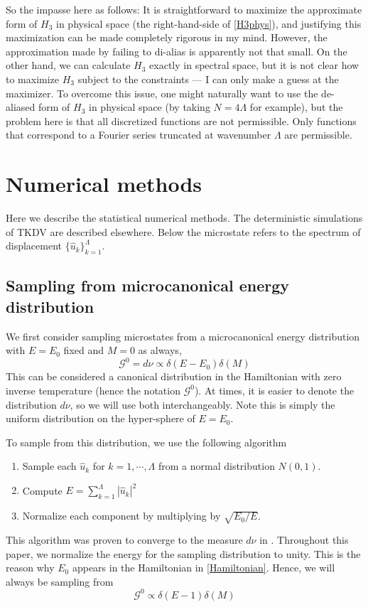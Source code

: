 \documentclass[12pt]{article}
\newcommand{\np}{\newpage \noindent}
\newcommand{\abs}[1]{\left| #1 \right|}
\newcommand{\uhat}{\hat{u}}
\newcommand{\sumk}{\sum_{k=1}^{\Lambda}}
\newcommand{\Gibbs}{\mathcal{G}}
\begin{document}
So the impasse here as follows: It is straightforward to maximize the approximate form of $H_3$ in physical space (the right-hand-side of \eqref{H3phys}), and justifying this maximization can be made completely rigorous in my mind. However, the approximation made by failing to di-alias is apparently not that small. On the other hand, we can calculate $H_3$ exactly in spectral space, but it is not clear how to maximize $H_3$ subject to the constraints --- I can only make a guess at the maximizer. To overcome this issue, one might naturally want to use the de-aliased form of $H_3$ in physical space (by taking $N = 4 \Lambda$ for example), but the problem here is that all discretized functions are not permissible. Only functions that correspond to a Fourier series truncated at wavenumber $\Lambda$ are permissible.

\np
\section{Numerical methods}

Here we describe the statistical numerical methods. The deterministic simulations of TKDV are described elsewhere. Below the microstate refers to the spectrum of displacement $\{ \uhat_k \}_{k=1}^{\Lambda}$.

\subsection{Sampling from microcanonical energy distribution}
\label{sec_microcan}

We first consider sampling microstates from a microcanonical energy distribution with $E=E_0$ fixed and $M=0$ as always,
\begin{equation}
\Gibbs^0 = d\nu \propto \delta(E-E_0) \delta(M)
\end{equation}
This can be considered a canonical distribution in the Hamiltonian with zero inverse temperature (hence the notation $\Gibbs^0$). At times, it is easier to denote the distribution $d\nu$, so we will use both interchangeably. Note this is simply the uniform distribution on the hyper-sphere of $E=E_0$.

To sample from this distribution, we use the following algorithm
\begin{enumerate}
\item Sample each $\uhat_k$ for $k=1,\cdots,\Lambda$ from a normal distribution $N(0,1)$.
\item Compute $E = \sumk \abs{\uhat_k}^2$
\item Normalize each component by multiplying by $\sqrt{E_0/E}$.
\end{enumerate}
This algorithm was proven to converge to the measure $d\nu$ in \cite{abramov2003hamiltonian}. Throughout this paper, we normalize the energy for the sampling distribution to unity. This is the reason why $E_0$ appears in the Hamiltonian in \eqref{Hamiltonian}. Hence, we will always be sampling from
\begin{equation}
\Gibbs^0 \propto \delta(E-1) \delta(M)
\end{equation}
\end{document}
